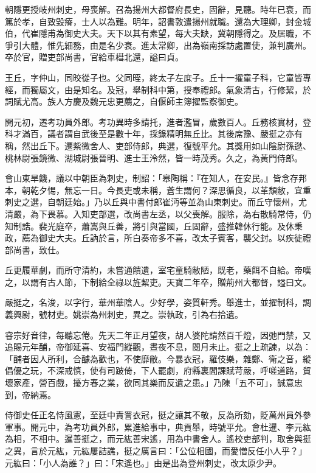 \begin{pinyinscope}
 朝隱更授岐州刺史，母喪解。召為揚州大都督府長史，固辭，見聽。時年已衰，而篤於孝，自致毀瘠，士人以為難。明年，詔書敦遣揚州就職。還為大理卿，封金城伯，代崔隱甫為御史大夫。天下以其有素望，每大夫缺，冀朝隱得之。及居職，不爭引大體，惟先細務，由是名少衰。進太常卿，出為嶺南採訪處置使，兼判廣州。卒於官，贈吏部尚書，官給車槥北還，謚曰貞。



 王丘，字仲山，同晈從子也。父同晊，終太子左庶子。丘十一擢童子科，它童皆專經，而獨屬文，由是知名。及冠，舉制科中第，授奉禮郎。氣象清古，行修絜，於詞賦尤高。族人方慶及魏元忠更薦之，自偃師主簿擢監察御史。



 開元初，遷考功員外郎。考功異時多請托，進者濫冒，歲數百人。丘務核實材，登科才滿百，議者謂自武後至是數十年，採錄精明無丘比。其後席豫、嚴挺之亦有稱，然出丘下。遷紫微舍人、吏部侍郎，典選，復號平允。其獎用如山陰尉孫逖、桃林尉張鏡微、湖城尉張晉明、進士王泠然，皆一時茂秀。久之，為黃門侍郎。



 會山東旱饑，議以中朝臣為刺史，制詔：「皋陶稱：『在知人，在安民。』皆念存邦本，朝乾夕惕，無忘一日。今長吏或未稱，蒼生謂何？深思循良，以革頹敝，宜重刺史之選，自朝廷始。」乃以丘與中書付郎崔沔等並為山東刺史。而丘守懷州，尤清嚴，為下畏慕。入知吏部選，改尚書左丞，以父喪解。服除，為右散騎常侍，仍知制誥。裴光庭卒，蕭嵩與丘善，將引與當國，丘固辭，盛推韓休行能。及休秉政，薦為御史大夫。丘訥於言，所白奏帝多不喜，改太子賓客，襲父封。以疾徙禮部尚書，致仕。



 丘更履華劇，而所守清約，未嘗通饋遺，室宅童騎敝陋，既老，藥餌不自給。帝嘆之，以謂有古人節，下制給全祿以旌絜吏。天寶二年卒，贈荊州大都督，謚曰文。



 嚴挺之，名浚，以字行，華州華陰人。少好學，姿質軒秀。舉進士，並擢制科，調義興尉，號材吏。姚崇為州刺史，異之。崇執政，引為右拾遺。



 睿宗好音律，每聽忘倦。先天二年正月望夜，胡人婆陀請然百千燈，因弛門禁，又追賜元年酺，帝御延喜、安福門縱觀，晝夜不息，閱月未止。挺之上疏諫，以為：「酺者因人所利，合醵為歡也，不使靡敝。今暴衣冠，羅伎樂，雜鄭、衛之音，縱倡優之玩，不深戒慎，使有司跛倚，下人罷劇，府縣裏閻課賦苛嚴，呼嗟道路，貿壞家產，營百戲，擾方春之業，欲同其樂而反遺之患。」乃陳「五不可」，誠意忠到，帝納焉。



 侍御史任正名恃風憲，至廷中責詈衣冠，挺之讓其不敬，反為所劾，貶萬州員外參軍事。開元中，為考功員外郎，累進給事中，典貢舉，時號平允。會杜暹、李元紘為相，不相中。暹善挺之，而元紘善宋遙，用為中書舍人。遙校吏部判，取舍與挺之異，言於元紘，元紘屢詰譙，挺之厲言曰：「公位相國，而愛憎反任小人乎？」元紘曰：「小人為誰？」曰：「宋遙也。」由是出為登州刺史，改太原少尹。




\end{pinyinscope}
